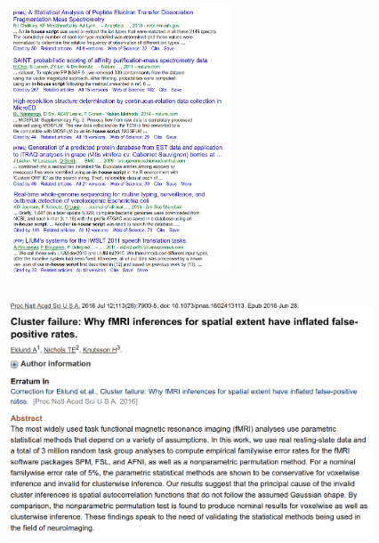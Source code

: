 \documentclass{beamer}
\begin{document}
\begin{frame}
  \frametitle{}
  \begin{center}
    \includegraphics[height=8cm]{images/In-house_script.jpg}
  \end{center}
\end{frame}

\begin{frame}
  \frametitle{}
  \begin{center}
    \includegraphics[height=7cm]{images/fMRI_software_failure.png}
  \end{center}
\end{frame}
\end{document}
